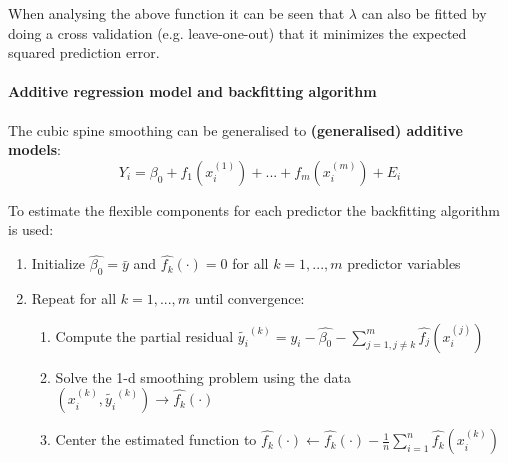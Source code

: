 When analysing the above function it can be seen that $\lambda$ can also be fitted by doing a cross validation (e.g. leave-one-out) that it minimizes the expected squared prediction error.

\paragraph{Additive regression model and backfitting algorithm}
The cubic spine smoothing can be generalised to \textbf{(generalised) additive models}:
\begin{equation*}
Y_i = \beta_0 + f_1(x_i^{(1)}) + ... + f_m(x_i^{(m)}) + E_i
\end{equation*}

To estimate the flexible components for each predictor the backfitting algorithm is used:
\begin{enumerate}
	\tightlist
	\item Initialize $\hat{\beta_0} = \bar{y}$ and $\hat{f_k}(\cdot)=0$ for all $k=1, ..., m$ predictor variables
	\item Repeat for all $k=1, ..., m$ until convergence:
	\begin{enumerate}
		\tightlist
		\item Compute the partial residual $\tilde{y_i}^{(k)} = y_i - \hat{\beta_0}-\sum_{j=1, j\neq k}^{m} \hat{f_j}(x_i^{(j)})$
		\item Solve the 1-d smoothing problem using the data $(x_i^{(k)}, \tilde{y_i}^{(k)}) \rightarrow \hat{f_k}(\cdot)$
		\item Center the estimated function to $\hat{f_k}(\cdot) \leftarrow \hat{f_k}(\cdot) - \frac{1}{n} \sum_{i=1}^{n} \hat{f_k}(x_i^{(k)})$
	\end{enumerate}
\end{enumerate}

